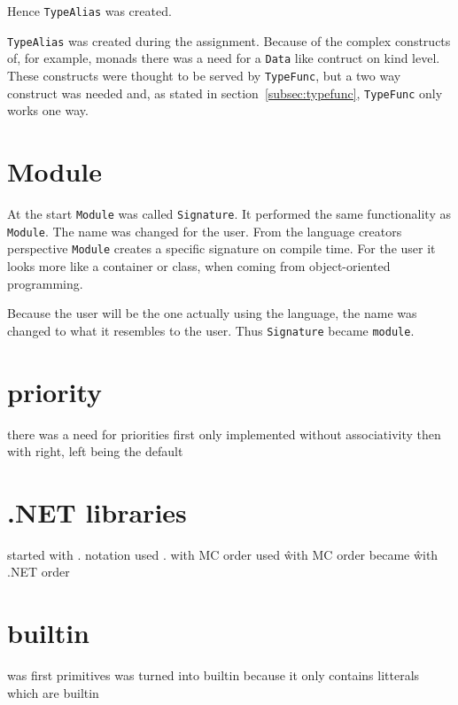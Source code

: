 Hence \verb|TypeAlias| was created.

\verb|TypeAlias| was created during the assignment.
Because of the complex constructs of, for example, monads there was a need for a \verb|Data| like contruct on kind level.
These constructs were thought to be served by \verb|TypeFunc|, but a two way construct was needed and, as stated in section~\ref{subsec:typefunc}, \verb|TypeFunc| only works one way.

\section{Module}
At the start \verb|Module| was called \verb|Signature|.
It performed the same functionality as \verb|Module|.
The name was changed for the user.
From the language creators perspective \verb|Module| creates a specific signature on compile time.
For the user it looks more like a container or class, when coming from object-oriented programming.

Because the user will be the one actually using the language, the name was changed to what it resembles to the user.
Thus \verb|Signature| became \verb|module|.

\section{priority}
there was a need for priorities
first only implemented without associativity
then with right, left being the default
\section{.NET libraries}
started with . notation
used . with MC order
used \^ with MC order
became \^ with .NET order
\section{builtin}
was first primitives
was turned into builtin because it only contains litterals which are builtin
